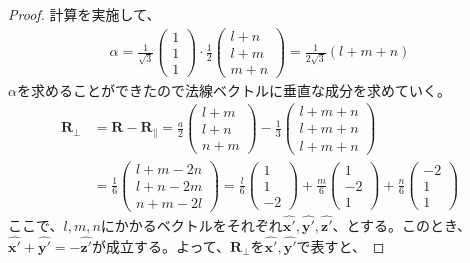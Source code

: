 \documentclass[a4paper,11pt,dvipdfmx]{jsarticle}
\begin{document}
\begin{enumerate}
\begin{itemize}
\begin{proof}
            計算を実施して、
            \begin{align*}
              \alpha = 
                \frac{1}{\sqrt{3}} \begin{pmatrix} 1 \\ 1 \\ 1 \end{pmatrix} 
                \cdot \frac{1}{2} \begin{pmatrix} l + n \\ l + m \\ m + n \end{pmatrix}
                = \frac{1}{2 \sqrt{3}} \left( l + m + n \right)
            \end{align*}
            $\alpha$を求めることができたので法線ベクトルに垂直な成分を求めていく。
            \begin{align*}
              \boldsymbol{R}_{\perp} &= \boldsymbol{R} - \boldsymbol{R}_{\parallel} = 
                \frac{a}{2} \begin{pmatrix}l + m \\ l + n \\ n + m\end{pmatrix} 
                - \frac{1}{3} \begin{pmatrix}l + m + n \\ l + m + n  \\ l + m + n \end{pmatrix}
                \\
                &= \frac{1}{6}\begin{pmatrix}l + m - 2n \\ l + n - 2m \\ n + m - 2l\end{pmatrix}
                = \frac{l}{6}\begin{pmatrix}1 \\ 1 \\ -2 \end{pmatrix} + \frac{m}{6}\begin{pmatrix}1 \\ -2 \\ 1 \end{pmatrix} + \frac{n}{6}\begin{pmatrix}-2 \\ 1 \\ 1 \end{pmatrix}
            \end{align*}
            ここで、$l, m , n$にかかるベクトルをそれぞれ$\hat{\boldsymbol{x}'}, \hat{\boldsymbol{y}'}, \hat{\boldsymbol{z}'}$、とする。このとき、$\hat{\boldsymbol{x}'} + \hat{\boldsymbol{y}'} = - \hat{\boldsymbol{z}'}$が成立する。よって、$\boldsymbol{R}_{\perp}$を$\hat{\boldsymbol{x}'}, \hat{\boldsymbol{y}'}$で表すと、

\end{proof}
\end{itemize}
\end{enumerate}
\end{document}
